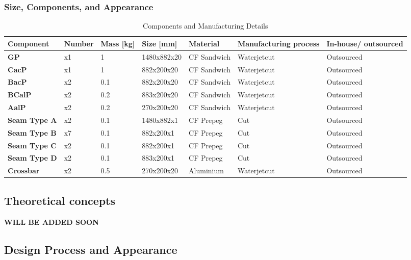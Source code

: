 \subsubsection{Size, Components, and Appearance}

\begin{table}[ht]
\centering

\label{table:components}
\begin{adjustbox}{width=\textwidth,center}
\begin{tabular}{|>{\bfseries}m{2.5cm}|m{1.4cm}|m{1.7cm}|m{2.1cm}|m{2.2cm}|m{2.6cm}|m{2.2cm}|}
\hline
Component & Number & Mass [kg] & Size [mm] & Material & Manufacturing process & In-house/ outsourced \\
\hline
GP & x1 & 1 & 1480x882x20 & CF Sandwich & Waterjetcut & Outsourced \\
CacP & x1 & 1 & 882x200x20 & CF Sandwich & Waterjetcut & Outsourced \\
BacP & x2 & 0.1 & 882x200x20 & CF Sandwich & Waterjetcut & Outsourced \\
BCalP & x2 & 0.2 & 883x200x20 & CF Sandwich & Waterjetcut & Outsourced \\
AalP & x2 & 0.2 & 270x200x20 & CF Sandwich & Waterjetcut & Outsourced \\
Seam Type A & x2 & 0.1 & 1480x882x1 & CF Prepeg & Cut & Outsourced \\
Seam Type B & x7 & 0.1 & 882x200x1 & CF Prepeg & Cut & Outsourced \\
Seam Type C & x2 & 0.1 & 882x200x1 & CF Prepeg & Cut & Outsourced \\
Seam Type D & x2 & 0.1 & 883x200x1 & CF Prepeg & Cut & Outsourced \\
Crossbar & x2 & 0.5 & 270x200x20 & Aluminium & Waterjetcut & Outsourced \\
\hline

\end{tabular}
\end{adjustbox}
\caption{Components and Manufacturing Details}
\end{table}




\subsection{Theoretical concepts}

\textbf{WILL BE ADDED SOON}




\subsection{Design Process and Appearance}


